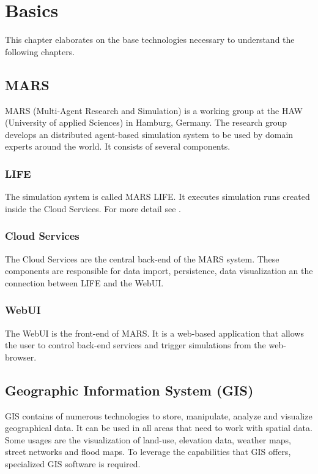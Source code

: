 
\chapter{Basics}
This chapter elaborates on the base technologies necessary to understand the following chapters.



\section{MARS}
MARS (Multi-Agent Research and Simulation) is a working group at the HAW (University of applied Sciences) in Hamburg, Germany. The research group develops an distributed agent-based simulation system to be used by domain experts around the world. It consists of several components.


\subsection{LIFE}
The simulation system is called MARS LIFE. It executes simulation runs created inside the Cloud Services. For more detail see \cite{Huning2016}.


\subsection{Cloud Services}
The Cloud Services are the central back-end of the MARS system. These components are responsible for data import, persistence, data visualization an the connection between LIFE and the WebUI.


\subsection{WebUI}
The WebUI is the front-end of MARS. It is a web-based application that allows the user to control back-end services and trigger simulations from the web-browser.



\section{Geographic Information System (GIS)}
GIS contains of numerous technologies to store, manipulate, analyze and visualize geographical data. It can be used in all areas that need to work with spatial data. Some usages are the visualization of land-use, elevation data, weather maps, street networks and flood maps. To leverage the capabilities that GIS offers, specialized GIS software is required.


